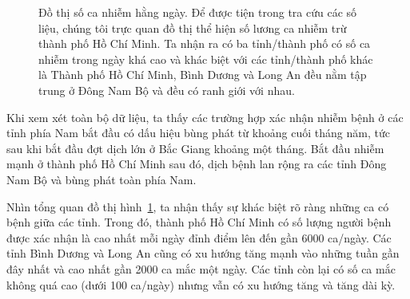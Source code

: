 \documentclass[../thesis.tex]{subfiles}
\begin{document}
\begin{figure}
		\centering
		\caption[Đồ thị số ca nhiễm hằng ngày]{Đồ thị số ca nhiễm hằng ngày. Để được tiện trong tra cứu các số liệu, chúng tôi trực quan đồ thị thể hiện số lương ca nhiễm trừ thành phố Hồ Chí Minh. Ta nhận ra có ba tỉnh/thành phố có số ca nhiễm trong ngày khá cao và khác biệt với các tỉnh/thành phố khác là Thành phố Hồ Chí Minh, Bình Dương và Long An đều nằm tập trung ở Đông Nam Bộ và đều có ranh giới với nhau. \label{fig:case}}
	\end{figure}

Khi xem xét toàn bộ dữ liệu, ta thấy các trường hợp xác nhận nhiễm bệnh ở các tỉnh phía Nam bắt đầu có dấu hiệu bùng phát từ khoảng cuối tháng năm, tức sau khi bắt đầu đợt dịch lớn ở Bắc Giang khoảng một tháng. Bắt đầu nhiễm mạnh ở thành phố Hồ Chí Minh sau đó, dịch bệnh lan rộng ra các tỉnh Đông Nam Bộ và bùng phát toàn phía Nam. 

Nhìn tổng quan đồ thị hình~\ref{fig:case}, ta nhận thấy sự khác biệt rõ ràng những ca có bệnh giữa các tỉnh. Trong đó, thành phố Hồ Chí Minh có số lượng người bệnh được xác nhận là cao nhất mỗi ngày đỉnh điểm lên đến gần 6000 ca/ngày. Các tỉnh Bình Dương và Long An cũng có xu hướng tăng mạnh vào những tuần gần đây nhất và cao nhất gần 2000 ca mắc một ngày. Các tỉnh còn lại có số ca mắc không quá cao (dưới 100 ca/ngày) nhưng vẫn có xu hướng tăng và tăng dài kỳ. 
\end{document}
